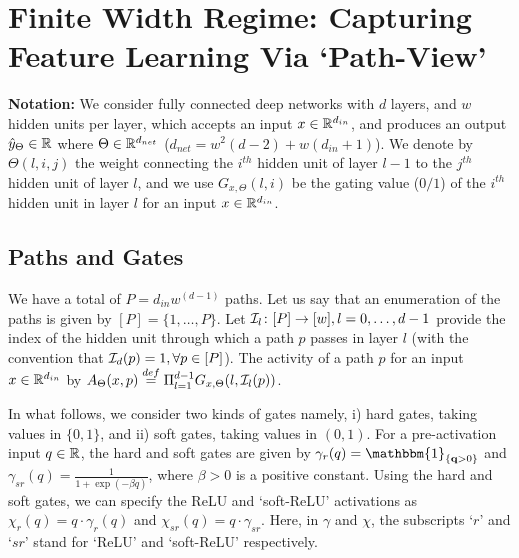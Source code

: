 \section{Finite Width Regime: Capturing Feature Learning Via `Path-View' }\label{sec:pathgate}
\textbf{Notation:} We consider fully connected deep networks with $d$ layers, and $w$ hidden units per layer, which accepts an input $x\in\mathbb{R}^{d_{in}}$, and produces an output $\hat{y}_{\Theta}\in \mathbb{R}$ where $\Theta\in\mathbb{R}^{d_{net}}$ ($d_{net}=w^2(d-2)+w(d_{in}+1)$). We denote by $\Theta(l,i,j)$ the weight connecting the $i^{th}$ hidden unit of layer $l-1$ to the $j^{th}$ hidden unit of layer $l$, and we use $G_{x,\Theta}(l,i)$ be the gating value ($0/1$) of the $i^{th}$ hidden unit in layer $l$ for an input $x\in \mathbb{R}^{d_{in}}$.
\subsection{Paths and Gates}
We have a total of $P=d_{in}w^{(d-1)}$ paths. Let us say that an enumeration of the paths is given by $[P]=\{1,\ldots,P\}$. Let $\mathcal{I}_{l}\colon [P]\rightarrow [w],l=0,\ldots,d-1$ provide the index of the hidden unit through which a path $p$ passes in layer $l$ (with the convention that $\mathcal{I}_d(p)=1,\forall p\in [P]$). The activity of a path $p$ for an input $x\in \mathbb{R}^{d_{in}}$ by $A_{\Theta}(x,p)\stackrel{def}{=}\Pi_{l=1}^{d-1} G_{x,\Theta}(l,\mathcal{I}_l(p))$.

In what follows, we consider two kinds of gates namely, i) hard gates, taking values in $\{0,1\}$, and ii) soft gates, taking values in $(0,1)$. For a pre-activation input $q\in\mathbb{R}$, the  hard and soft gates are given by $\gamma_{r}(q)=\mathbbm{1}_{\{\q>0\}}$ and $\gamma_{sr}(q)=\frac{1}{1+\exp(-\beta q)}$, where $\beta>0$ is a positive constant. Using the hard and soft gates, we can specify the ReLU and `soft-ReLU' activations as $\chi_{r}(q)=q\cdot\gamma_r(q)$ and $\chi_{sr}(q)=q\cdot\gamma_{sr}$. Here, in $\gamma$ and $\chi$, the subscripts `$r$' and `$sr$' stand for `ReLU' and `soft-ReLU' respectively.

